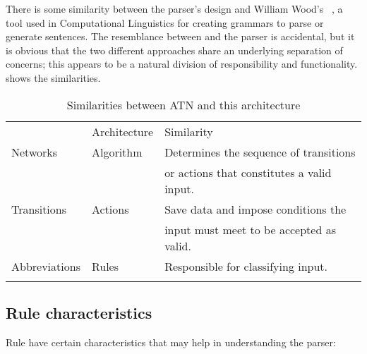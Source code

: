 There is some similarity between the parser's design and William Wood's
\ATN{}~\cite{atns,nlpip}, a tool used in Computational Linguistics for
creating grammars to parse or generate sentences.  The resemblance between
\ATN{} and the parser is accidental, but it is obvious that the two
different approaches share an underlying separation of concerns; this
appears to be a natural division of responsibility and functionality.
 shows the
similarities.


\begin{table}[ht]
    \caption{Similarities between ATN and this architecture}
    \empty{}\label{Similarities between ATN and this architecture}
    \begin{tabular}[]{lll}
        \tableline{}
        \ATN{}          & Architecture  & Similarity                \\
        \tableline{}
        Networks        & Algorithm     & Determines the sequence 
                                        of transitions              \\
                        &               & or actions that 
                                        constitutes a valid  input. \\
        Transitions     & Actions       & Save data and impose
                                        conditions the              \\
                        &               & input must meet to be
                                        accepted as valid.          \\
        Abbreviations   & Rules         & Responsible for 
                                        classifying input.          \\
        \tableline{}
    \end{tabular}
\end{table}

\subsection{Rule characteristics}

\label{rule characteristics}

Rule have certain characteristics that may help in understanding the
parser:

